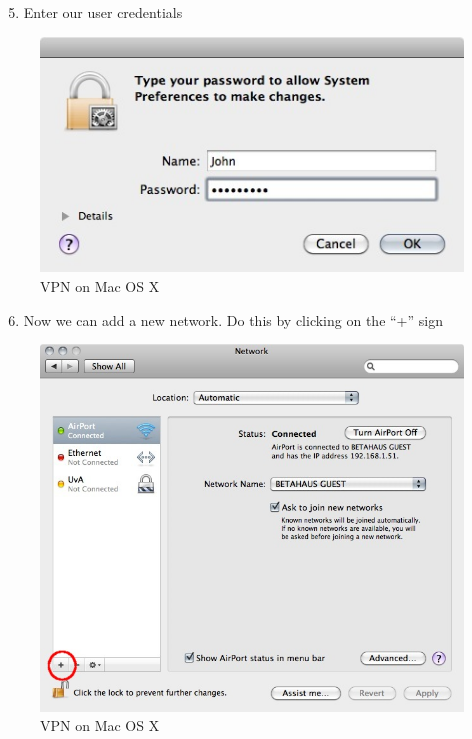 \begin{enumerate}[1.]
\setcounter{enumi}{4}
\item
  Enter our user credentials
\end{enumerate}
\begin{figure}[htbp]
\centering
\includegraphics{vpn_osx_05.jpg}
\caption{VPN on Mac OS X}
\end{figure}

\begin{enumerate}[1.]
\setcounter{enumi}{5}
\item
  Now we can add a new network. Do this by clicking on the ``+'' sign
\end{enumerate}
\begin{figure}[htbp]
\centering
\includegraphics{vpn_osx_06.jpg}
\caption{VPN on Mac OS X}
\end{figure}

